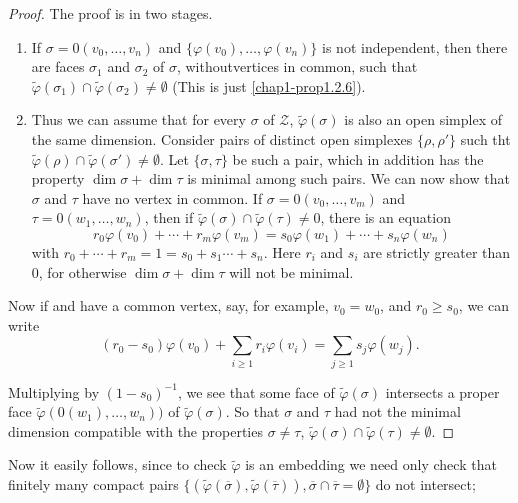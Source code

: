 \begin{proof}
The proof is in two stages.
\begin{enumerate}
\renewcommand{\theenumi}{\Alph{enumi}}
\renewcommand{\labelenumi}{(\theenumi)}
\item If $\sigma=0(v_{0},\ldots,v_{n})$ and $\{\varphi(v_{0}),\ldots,\varphi(v_{n})\}$ is not independent, then there are faces $\sigma_{1}$ and $\sigma_{2}$ of $\sigma$, without\pageoriginale vertices in common, such that $\widetilde{\varphi}(\sigma_{1})\cap \widetilde{\varphi}(\sigma_{2})\neq \emptyset$ (This is just \ref{chap1-prop1.2.6}).

\item Thus we can assume that for every $\sigma$ of $\mathscr{Z}$, $\widetilde{\varphi}(\sigma)$ is also an open simplex of the same dimension. Consider pairs of distinct open simplexes $\{\rho,\rho'\}$ such tht $\widetilde{\varphi}(\rho)\cap \widetilde{\varphi}(\sigma')\neq \emptyset$. Let $\{\sigma,\tau\}$ be such a pair, which in addition has the property $\dim \sigma+\dim \tau$ is minimal among such pairs. We can now show that $\sigma$ and $\tau$ have no vertex in common. If $\sigma=0(v_{0},\ldots,v_{m})$ and $\tau=0(w_{1},\ldots,w_{n})$, then if $\widetilde{\varphi}(\sigma)\cap \widetilde{\varphi}(\tau)\neq 0$, there is an equation
$$
r_{0}\varphi(v_{0})+\cdots+r_{m}\varphi(v_{m})=s_{0}\varphi(w_{1})+\cdots+s_{n}\varphi(w_{n})
$$
with $r_{0}+\cdots+r_{m}=1=s_{0} + s_{1}\cdots+s_{n}$. Here $r_{i}$ and $s_{i}$ are strictly greater than $0$, for otherwise $\dim \sigma+\dim \tau$ will not be minimal.
\end{enumerate}

Now if and have a common vertex, say, for example, $v_{0}=w_{0}$, and $r_{0}\geq s_{0}$, we can write
$$
(r_{0}-s_{0})\varphi(v_{0})+\sum\limits_{i\geq 1}r_{i}\varphi(v_{i})=\sum\limits_{j\geq 1}s_{j}\varphi(w_{j}).
$$

Multiplying by $(1-s_{0})^{-1}$, we see that some face of $\widetilde{\varphi}(\sigma)$ intersects a proper face $\widetilde{\varphi}(0(w_{1}),\ldots,w_{n}))$ of $\widetilde{\varphi}(\sigma)$. So that $\sigma$ and $\tau$ had not the minimal dimension compatible with the properties $\sigma\neq \tau$, $\widetilde{\varphi}(\sigma)\cap \widetilde{\varphi}(\tau)\neq \emptyset$.
\end{proof}

Now it easily follows, since to check $\widetilde{\varphi}$ is an embedding we need only check that finitely many compact pairs $\{(\widetilde{\varphi}(\overline{\sigma}),\widetilde{\varphi}(\overline{\tau})),\overline{\sigma}\cap \overline{\tau}=\emptyset\}$ do not intersect;

